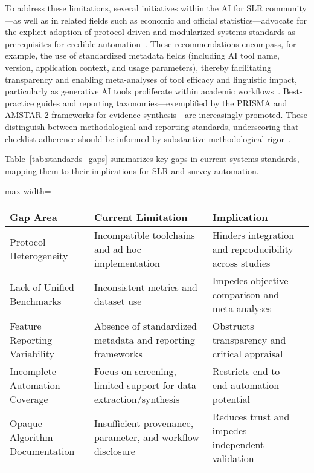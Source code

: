 \documentclass[sigconf]{acmart}
\begin{document}
To address these limitations, several initiatives within the AI for SLR community—as well as in related fields such as economic and official statistics—advocate for the explicit adoption of protocol-driven and modularized systems standards as prerequisites for credible automation~\cite{ref30,ref37,ref43,ref51,ref61,ref89}. These recommendations encompass, for example, the use of standardized metadata fields (including AI tool name, version, application context, and usage parameters), thereby facilitating transparency and enabling meta-analyses of tool efficacy and linguistic impact, particularly as generative AI tools proliferate within academic workflows~\cite{ref98}. Best-practice guides and reporting taxonomies—exemplified by the PRISMA and AMSTAR-2 frameworks for evidence synthesis—are increasingly promoted. These distinguish between methodological and reporting standards, underscoring that checklist adherence should be informed by substantive methodological rigor~\cite{ref43,ref63,ref86,ref106}.

Table~\ref{tab:standards_gaps} summarizes key gaps in current systems standards, mapping them to their implications for SLR and survey automation.

\begin{table*}[htbp]
\centering
\caption{Key Gaps in System Standards and Their Implications for SLR Automation}
\label{tab:standards_gaps}
\begin{adjustbox}{max width=\textwidth}
\begin{tabular}{@{}llll@{}}
\toprule
Gap Area & Current Limitation & Implication &  \\
\midrule
Protocol Heterogeneity & Incompatible toolchains and ad hoc implementation & Hinders integration and reproducibility across studies &  \\
Lack of Unified Benchmarks & Inconsistent metrics and dataset use & Impedes objective comparison and meta-analyses &  \\
Feature Reporting Variability & Absence of standardized metadata and reporting frameworks & Obstructs transparency and critical appraisal &  \\
Incomplete Automation Coverage & Focus on screening, limited support for data extraction/synthesis & Restricts end-to-end automation potential &  \\
Opaque Algorithm Documentation & Insufficient provenance, parameter, and workflow disclosure & Reduces trust and impedes independent validation &  \\
\bottomrule
\end{tabular}
\end{adjustbox}
\end{table*}
\end{document}
